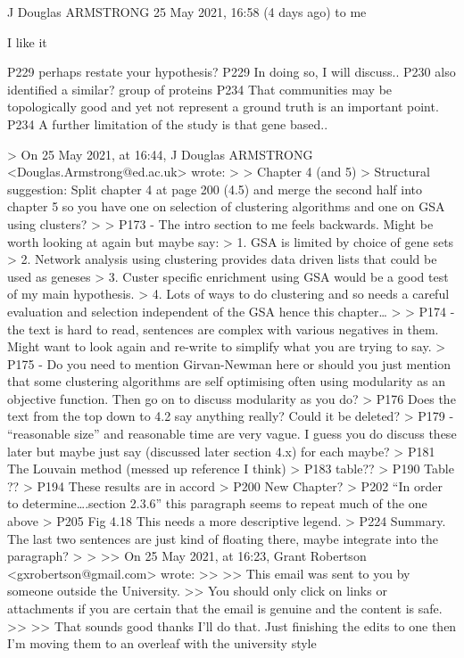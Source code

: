 
J Douglas ARMSTRONG
25 May 2021, 16:58 (4 days ago)
to me


I like it

P229 perhaps restate your hypothesis?
P229 In doing so, I will discuss..
P230 also identified a similar? group of proteins
P234 That communities may be topologically good and yet not represent a ground truth is an important point.
P234 A further limitation of the study is that gene based..


> On 25 May 2021, at 16:44, J Douglas ARMSTRONG <Douglas.Armstrong@ed.ac.uk> wrote:
>
> Chapter 4 (and 5)
> Structural suggestion: Split chapter 4 at page 200 (4.5) and merge the second half into chapter 5 so you have one on selection of clustering algorithms and one on GSA using clusters?
>
> P173 - The intro section to me feels backwards. Might be worth looking at again but maybe say:
> 1. GSA is limited by choice of gene sets
> 2. Network analysis using clustering provides data driven lists that could be used as geneses
> 3. Custer specific enrichment using GSA would be a good test of my main hypothesis.
> 4. Lots of ways to do clustering and so needs a careful evaluation and selection independent of the GSA hence this chapter…
>
> P174 - the text is hard to read, sentences are complex with various negatives in them. Might want to look again and re-write to simplify what you are trying to say.
> P175 - Do you need to mention Girvan-Newman here or should you just mention that some clustering algorithms are self optimising often using modularity as an objective function. Then go on to discuss modularity as you do?
> P176 Does the text from the top down to 4.2 say anything really? Could it be deleted?
> P179 - “reasonable size” and reasonable time are very vague. I guess you do discuss these later but maybe just say (discussed later section 4.x) for each maybe?
> P181 The Louvain method (messed up reference I think)
> P183 table??
> P190 Table ??
> P194 These results are in accord
> P200 New Chapter?
> P202 “In order to determine….section 2.3.6” this paragraph seems to repeat much of the one above
> P205 Fig 4.18 This needs a more descriptive legend.
> P224 Summary. The last two sentences are just kind of floating there, maybe integrate into the paragraph?
>
>
>> On 25 May 2021, at 16:23, Grant Robertson <gxrobertson@gmail.com> wrote:
>>
>> This email was sent to you by someone outside the University.
>> You should only click on links or attachments if you are certain that the email is genuine and the content is safe.
>>
>> That sounds good thanks I’ll do that. Just finishing the edits to one then I’m moving them to an overleaf with the university style

